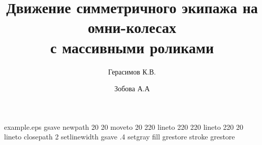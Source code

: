 \begin{filecontents*}{example.eps}
gsave
newpath
  20 20 moveto
  20 220 lineto
  220 220 lineto
  220 20 lineto
closepath
2 setlinewidth
gsave
  .4 setgray fill
grestore
stroke
grestore
\end{filecontents*}



\RequirePackage{fix-cm}

\documentclass[smallextended]{./springer/svjour3}       %






\title{Движение симметричного экипажа на омни-колесах\\с массивными роликами}

\author{Герасимов К.В. \and
        Зобова А.А
}


\maketitle

